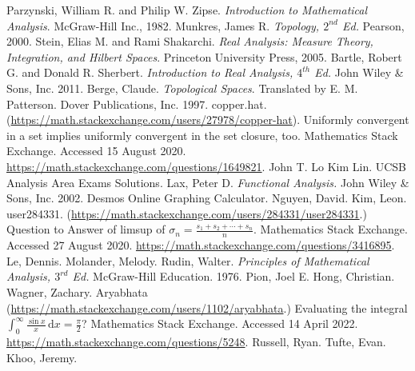 \documentclass[12pt]{article}
\newcommand{\ita}[1]{\textit{#1}}
\renewcommand{\i}[4]{\int_{#1}^{#2} {#3} \, \mathrm{d} {#4} }
\theoremstyle{definition}
\begin{document}
\newpage
{}
{}
\begin{thebibliography}{99}
     Parzynski, William R. and Philip W. Zipse. \ita{Introduction to Mathematical Analysis}. McGraw-Hill Inc., 1982.
     Munkres, James R. \ita{Topology, $2^{nd}$ Ed.} Pearson, 2000.
     Stein, Elias M. and Rami Shakarchi. \ita{Real Analysis: Measure Theory, Integration, and Hilbert Spaces}. Princeton University Press, 2005.
     Bartle, Robert G. and Donald R. Sherbert. \ita{Introduction to Real Analysis, $4^{th}$ Ed.} John Wiley \& Sons, Inc. 2011.
     Berge, Claude. \ita{Topological Spaces}. Translated by E. M. Patterson. Dover Publications, Inc. 1997.
     copper.hat. (\url{https://math.stackexchange.com/users/27978/copper-hat}). Uniformly convergent in a set implies uniformly convergent in the set closure, too. Mathematics Stack Exchange. Accessed 15 August 2020. \url{https://math.stackexchange.com/questions/1649821}.
     John T. Lo Kim Lin. UCSB Analysis Area Exams Solutions. 
     Lax, Peter D. \ita{Functional Analysis.} John Wiley \& Sons, Inc. 2002.
     Desmos Online Graphing Calculator.
     Nguyen, David. 
     Kim, Leon.
     user284331. (\url{https://math.stackexchange.com/users/284331/user284331}.) Question to Answer of limsup of $\sigma_n = \frac{s_1 + s_2 + \dotsb + s_n}{n}$. Mathematics Stack Exchange. Accessed 27 August 2020. \url{https://math.stackexchange.com/questions/3416895}. 
     Le, Dennis.
     Molander, Melody.
     Rudin, Walter. \ita{Principles of Mathematical Analysis, $3^{rd}$ Ed.} McGraw-Hill Education. 1976.
     Pion, Joel E. 
     Hong, Christian. 
     Wagner, Zachary.
     Aryabhata (\url{https://math.stackexchange.com/users/1102/aryabhata}.) Evaluating the integral $\i{0}{\infty}{\frac{\sin x}{x}}{x} = \frac{\pi}{2}$?  Mathematics Stack Exchange. Accessed 14 April 2022. \url{https://math.stackexchange.com/questions/5248}. 
     Russell, Ryan.
     Tufte, Evan. 
     Khoo, Jeremy.
\end{thebibliography}
\end{document}
